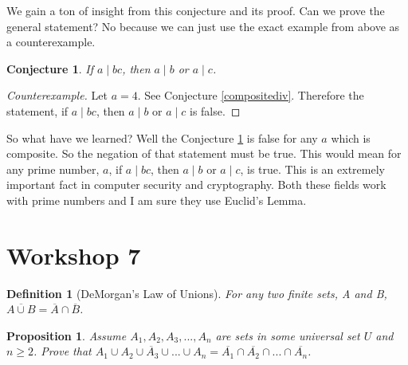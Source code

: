 \documentclass{article}
\newtheorem{prop}{Proposition}
\newtheorem{definition}{Definition}
\newtheorem{conjecture}{Conjecture}
\begin{document}
We gain a ton of insight from this conjecture and its proof. Can we prove the general statement? No because we can just use the exact example from above as a counterexample.

\begin{conjecture} \label{general}
If $a\mid bc$, then $a\mid b$ or $a\mid c$.
\end{conjecture}
\begin{proof}[Counterexample]
Let $a=4$. See Conjecture \ref{compositediv}.
Therefore the statement, if $a\mid bc$, then $a\mid b$ or $a\mid c$ is false.
\end{proof}

So what have we learned? Well the Conjecture \ref{general} is false for any $a$ which is composite. So the negation of that statement must be true. This would mean for any prime number, $a$, if $a\mid bc$, then $a\mid b$ or $a\mid c$, is true. This is an extremely important fact in computer security and cryptography. Both these fields work with prime numbers and I am sure they use Euclid's Lemma.


\section{Workshop 7}

\begin{definition} [DeMorgan's Law of Unions]
For any two finite sets, A and B, $\overline{A\cup B}=\overline{A}\cap \overline{B}$.
\end{definition}

\begin{prop}
Assume $A_{1},A_{2},A_{3},...,A_{n}$ are sets in some universal set $U$ and $n\geq 2$. Prove that $\overline{A_{1}\cup A_{2}\cup A_{3}\cup ...\cup A_{n}}=\overline{A_{1}}\cap \overline{A_{2}}\cap ... \cap \overline{A_{n}}$.
\end{prop}
\end{document}
